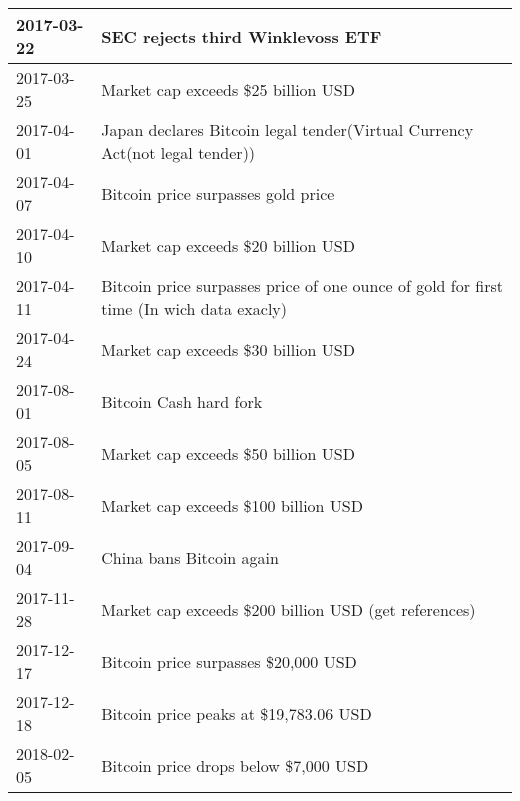 \begin{table}[h]
\begin{tabular}{|l|l|}
\\ \hline
2017-03-22 & SEC rejects third Winklevoss ETF
\\ \hline
2017-03-25 & Market cap exceeds \$25 billion USD
\\ \hline
2017-04-01 & Japan declares Bitcoin legal tender(Virtual Currency Act(not legal tender))
\\ \hline
2017-04-07 & Bitcoin price surpasses gold price
\\ \hline
2017-04-10 & Market cap exceeds \$20 billion USD
\\ \hline
2017-04-11 & Bitcoin price surpasses price of one ounce of gold for first time (In wich data exacly)
\\ \hline
2017-04-24 & Market cap exceeds \$30 billion USD
\\ \hline
2017-08-01 & Bitcoin Cash hard fork
\\ \hline
2017-08-05 & Market cap exceeds \$50 billion USD
\\ \hline
2017-08-11 & Market cap exceeds \$100 billion USD
\\ \hline
2017-09-04 & China bans Bitcoin again
\\ \hline
2017-11-28 & Market cap exceeds \$200 billion USD (get references)
\\ \hline
2017-12-17 & Bitcoin price surpasses \$20,000 USD
\\ \hline
2017-12-18 & Bitcoin price peaks at \$19,783.06 USD
\\ \hline
2018-02-05 & Bitcoin price drops below \$7,000 USD
\end{tabular}
\end{table}



